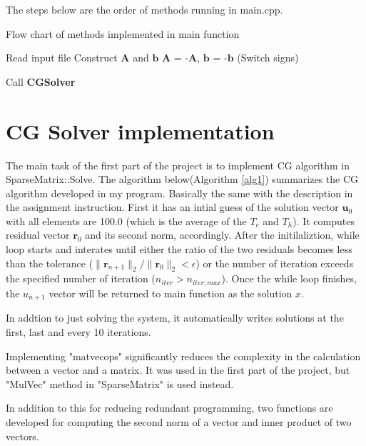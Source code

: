 \documentclass{article}
\begin{document}
The steps below are the order of methods running in main.cpp.

\begin{algorithm} 
    \caption{Flow chart of methods implemented in main function}
    \label{alg0}
    \begin{algorithmic}
        \STATE \qquad Read input file 
        \STATE \qquad Construct $\mathbf{A}$ and $\mathbf{b}$
        \STATE \qquad $\mathbf{A}$
         = -$\mathbf{A}$, $\mathbf{b}$ = -$\mathbf{b}$ (Switch signs)
        \STATE {}

        \STATE \qquad Call {\bf CGSolver}
    \end{algorithmic}
\end{algorithm}


\section*{CG Solver implementation}
The main task of the first part of the project is
to implement CG algorithm in SparseMatrix::Solve.
The algorithm below(Algorithm \ref{alg1}) summarizes 
the CG algorithm developed in my program.
Basically the same with the description 
in the assignment instruction.
First it has an intial guess of the solution vector 
$\mathbf{u}_0$ with all elements are 100.0
 (which is the average of the $T_c$ and $T_h$).
It computes residual vector $\mathbf{r}_0$ 
and its second norm, accordingly.
After the initilaliztion, while loop starts and interates 
until either the ratio of the two residuals 
becomes less than the tolerance 
($ \|\mathbf{r}_{n+1}\|_2 / \|\mathbf{r}_0\|_2 < \epsilon $) or
the number of iteration exceeds the specified number of iteration 
($n_{iter} > n_{iter,max}$).
Once the while loop finishes, 
the $u_{n+1}$ vector will be returned to main function as the solution $x$.

In addtion to just solving the system, it automatically writes solutions
at the first, last and every 10 iterations.

Implementing "matvecops" significantly reduces the complexity 
in the calculation between a vector and a matrix.
It was used in the first part of the project, but "MulVec" method
 in "SparseMatrix" is used instead.

In addition to this for reducing redundant programming, 
two functions are developed for computing the second norm of a vector 
and inner product of two vectors.
\end{document}
